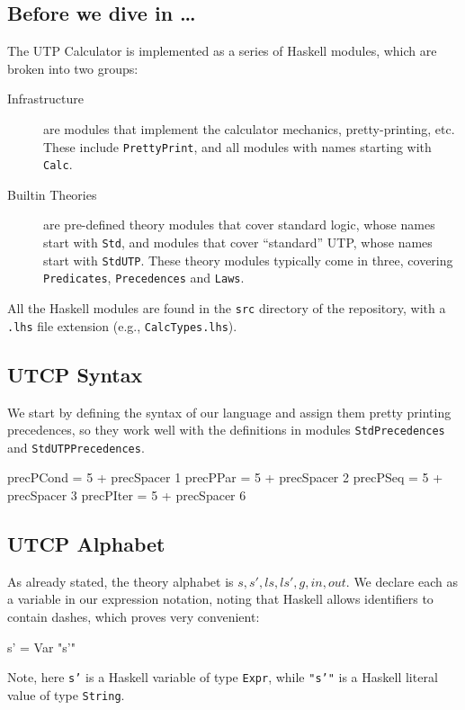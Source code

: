\subsection{Before we dive in \dots}

The UTP Calculator is implemented as a series
of Haskell modules,
which are broken into two groups:
\begin{description}
  \item[Infrastructure]
    are modules that implement the calculator mechanics,
    pretty-printing, etc.
    These include \texttt{PrettyPrint},
    and all modules with names starting with \texttt{Calc}.
  \item[Builtin Theories]
    are pre-defined theory modules that cover standard logic,
    whose names start with \texttt{Std}, and modules that cover ``standard''
    UTP, whose names start with \texttt{StdUTP}.
    These theory modules typically come in three, covering
    \texttt{Predicates}, \texttt{Precedences} and \texttt{Laws}.
\end{description}
All the Haskell modules are found in the \texttt{src} directory
of the repository, with a \texttt{.lhs} file extension
(e.g., \texttt{CalcTypes.lhs}).

\subsection{UTCP Syntax}

We start by defining the syntax of our language
\noindent
and assign them pretty printing precedences,
so they work well with the definitions in modules
\texttt{StdPrecedences} and \texttt{StdUTPPrecedences}.
\begin{code}
precPCond = 5 + precSpacer  1
precPPar  = 5 + precSpacer  2
precPSeq  = 5 + precSpacer  3
precPIter = 5 + precSpacer  6
\end{code}


\subsection{UTCP Alphabet}

As already stated, the theory alphabet is $s,s',ls,ls',g,in,out$.
We declare each as a variable in our expression notation,
noting that Haskell allows identifiers to contain dashes,
which proves very convenient:
\begin{code}
s' = Var "s'"
\end{code}
Note, here \texttt{s'} is a Haskell variable of type \texttt{Expr},
while \texttt{"s'"} is a Haskell literal value of type \texttt{String}.

